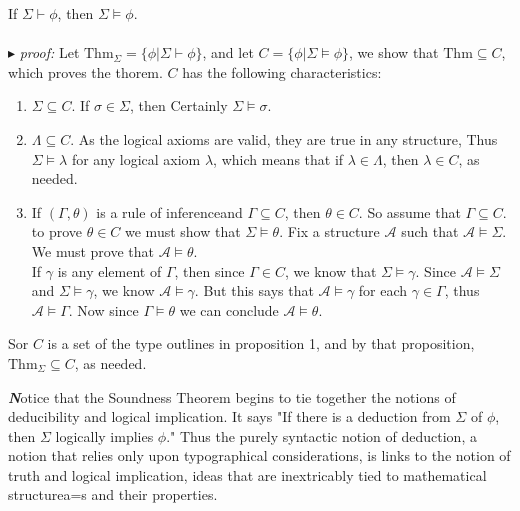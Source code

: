 \documentclass[9pt,a4paper]{article}
\newcounter{theo}
\newenvironment{callout}
	{\begin{calloutbox}\color{charcoal}\textbf\textit}
	{\end{calloutbox}}
\newcommand{\curveA}{\mathcal{A}}
\newcommand{\thm}{\text{Thm}}
\newcommand{\proof}{\ \\ \ \\ $\blacktriangleright$ \textit{proof: }}
\begin{document}
        \begin{theorem}
            If $\Sigma\vdash\phi$, then $\Sigma \vDash\phi$.
            \proof Let $\thm_\Sigma = \{\phi|\Sigma\vdash\phi\}$, and let $C=\{\phi|\Sigma\vDash \phi\}$, we show that $\thm\subseteq C$, which proves the thorem. $C$ has the following characteristics:
            \begin{enumerate}
                \item $\Sigma\subseteq C$. If $\sigma \in \Sigma$, then Certainly $\Sigma\vDash\sigma$.
                \item $\Lambda \subseteq C$. As the logical axioms are valid, they are true in any structure, Thus $\Sigma\vDash \lambda$ for any logical axiom $\lambda$, which means that if $\lambda \in \Lambda$, then $\lambda \in C$, as needed.
                \item If $(\Gamma, \theta)$ is a rule of inferenceand $\Gamma\subseteq C$, then $\theta\in C$. So assume that $\Gamma\subseteq C$. to prove $\theta\in C$ we must show that $\Sigma\vDash \theta$. Fix a structure $\curveA$ such that $\curveA \vDash\Sigma$. We must prove that $\curveA\vDash\theta$. 
                \\
                If $\gamma$ is any element of $\Gamma$, then since $\Gamma\in C$, we know that $\Sigma\vDash \gamma$. Since $\curveA\vDash \Sigma$ and $\Sigma\vDash\gamma$, we know $\curveA\vDash\gamma$. But this says that $\curveA\vDash\gamma$ for each $\gamma\in\Gamma$, thus $\curveA\vDash\Gamma$. Now since $\Gamma\vDash \theta$ we can conclude $\curveA\vDash\theta$.
            \end{enumerate}
            Sor $C$ is a set of the type outlines in proposition 1, and by that proposition, $\thm_\Sigma\subseteq C$, as needed.
        \end{theorem}
        \begin{callout}
            Notice that the Soundness Theorem begins to tie together the notions of deducibility and logical implication. It says "If there is a deduction from $\Sigma$ of $\phi$, then $\Sigma$ logically implies $\phi$." Thus the purely syntactic notion of deduction, a notion that relies only upon typographical considerations, is links to the notion of truth and logical implication, ideas that are inextricably tied to mathematical structurea=s and their properties.
        \end{callout}
\end{document}
